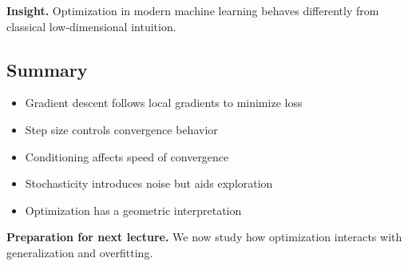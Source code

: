\medskip

\noindent
\textbf{Insight.}  
Optimization in modern machine learning behaves differently from classical low-dimensional intuition.

\subsection{Summary}

\begin{itemize}
    \item Gradient descent follows local gradients to minimize loss
    \item Step size controls convergence behavior
    \item Conditioning affects speed of convergence
    \item Stochasticity introduces noise but aids exploration
    \item Optimization has a geometric interpretation
\end{itemize}

\medskip

\noindent
\textbf{Preparation for next lecture.}  
We now study how optimization interacts with generalization and overfitting.